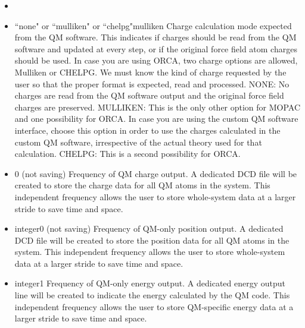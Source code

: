 \begin{itemize}
\item
{}

\item
{}%
{``none" or ``mulliken" or ``chelpg"}{mulliken}{%
Charge calculation mode expected from the QM software. This
indicates if charges should be read from the QM software and
updated at every step, or if the original force field atom
charges should be used. In case you are using ORCA, two charge
options are allowed, Mulliken or CHELPG. We must know the kind
of charge requested by the user so that the proper format is expected,
read and processed. NONE: No charges are read from the QM software
output and the original force field charges are preserved.
MULLIKEN: This is the only other option for MOPAC and one possibility
for ORCA. In case you are using the custom QM software interface,
choose this option in order to use the charges calculated in the
custom QM software, irrespective of the actual theory used for
that calculation. CHELPG: This is a second possibility for ORCA.
}

\item
{}%
{0 (not saving)}{%
Frequency of QM charge output. A dedicated DCD file will be created
to store the charge data for all QM atoms in the system. This
independent frequency allows the user to store whole-system data
at a larger stride to save time and space.
}

\item
{}%
{integer}{0 (not saving)}{%
Frequency of QM-only position output. A dedicated DCD file will be
created to store the position data for all QM atoms in the system.
This independent frequency allows the user to store whole-system
data at a larger stride to save time and space.
}

\item
{}%
{integer}{1}{%
Frequency of QM-only energy output. A dedicated energy output line will be 
created to indicate the energy calculated by the QM code.
This independent frequency allows the user to store QM-specific energy 
data at a larger stride to save time and space.
}



\end{itemize}
